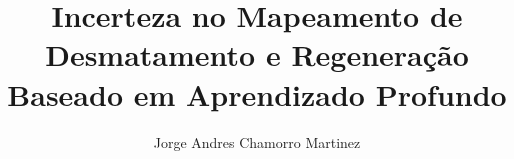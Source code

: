 \documentclass[phd, american]{ThesisPUC}
\title{Incerteza no Mapeamento de Desmatamento e Regeneração Baseado em Aprendizado Profundo}
\author{Jorge Andres Chamorro Martinez}
\begin{document}
   
   
   
   
   
   
   
   \arial
   
   \normalfont
%   
\end{document}

